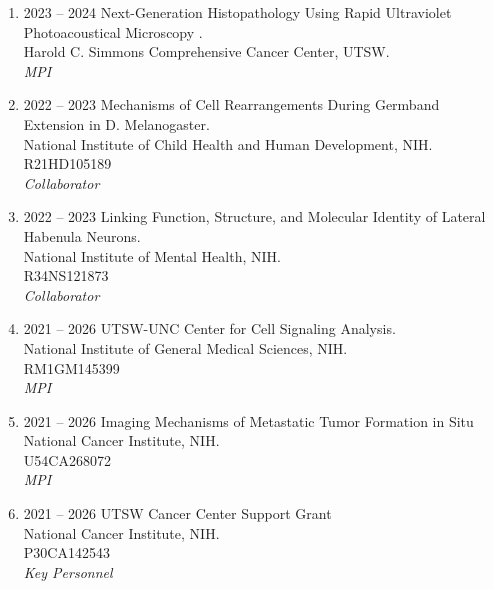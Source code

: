 \begin{enumerate}
[leftmargin=!,
labelindent=0pt,
itemindent=-66pt,
label=\textbullet]

\item 2023 -- 2024 
\hspace{8pt}
Next-Generation Histopathology Using Rapid Ultraviolet Photoacoustical Microscopy . \\
Harold C. Simmons Comprehensive Cancer Center, UTSW. \\
{\it MPI}

\item 2022 -- 2023 
\hspace{8pt}
Mechanisms of Cell Rearrangements During Germband Extension in D. Melanogaster.\\
National Institute of Child Health and Human Development, NIH. \\
R21HD105189 \\
{\it Collaborator}

\item 2022 -- 2023 
\hspace{8pt}
Linking Function, Structure, and Molecular Identity of Lateral Habenula Neurons. \\
National Institute of Mental Health, NIH. \\
R34NS121873 \\
{\it Collaborator}

\item 2021 -- 2026 
\hspace{8pt}
UTSW-UNC Center for Cell Signaling Analysis. \\
National Institute of General Medical Sciences, NIH. \\
RM1GM145399 \\ 
{\it MPI}

\item 2021 -- 2026 
\hspace{8pt}
Imaging Mechanisms of Metastatic Tumor Formation in Situ \\
National Cancer Institute, NIH. \\
U54CA268072 \\ 
{\it MPI}

\item 2021 -- 2026 
\hspace{8pt}
UTSW Cancer Center Support Grant \\
National Cancer Institute, NIH. \\
P30CA142543 \\ 
{\it Key Personnel}


\end{enumerate}
